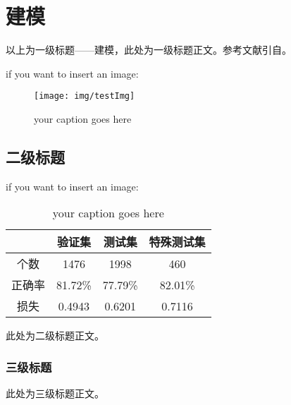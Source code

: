
\chapter{建模}%
以上为一级标题——建模，此处为一级标题正文。参考文献引自\cite{ctex-doc}。

\par if you want to insert an image:
\begin{figure}[H]
	\centering
	\texttt{[image: img/testImg]}
	\caption{your caption goes here}
\end{figure}
\section{二级标题}


\par if you want to insert an image:
\begin{table}[H]
\centering
\begin{tabular}{|c|c|c|c|}
\hline
    & 验证集     & 测试集     & 特殊测试集   \\ \hline
个数  & 1476    & 1998    & 460     \\ \hline
正确率 & 81.72\% & 77.79\% & 82.01\% \\ \hline
损失  & 0.4943  & 0.6201  & 0.7116  \\ \hline
\end{tabular}
\caption{your caption goes here}
\end{table}



此处为二级标题正文。
\subsection{三级标题}
此处为三级标题正文。
